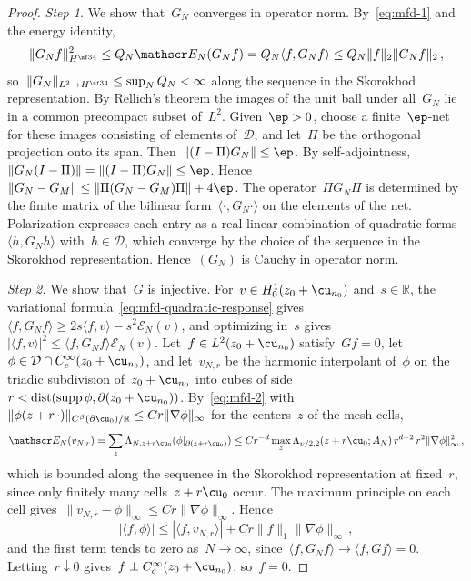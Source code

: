 \documentclass[11pt]{amsart}
\begin{document}
\begin{proof}
\emph{Step 1.} We show that~$G_N$ converges in operator norm. By~\eqref{eq:mfd-1} and the energy identity,
\begin{equation*}
	\|G_Nf\|_{H^{\nf34}}^2\leq Q_N\mathscr E_N(G_Nf)=Q_N\langle f,G_Nf\rangle\leq Q_N\|f\|_2\|G_Nf\|_2\,,
\end{equation*}
so~$\|G_N\|_{L^2\to H^{\nf34}}\leq\sup_NQ_N<\infty$ along the sequence in the Skorokhod representation. By Rellich's theorem the images of the unit ball under all~$G_N$ lie in a common precompact subset of~$L^2$. Given~$\ep>0$, choose a finite~$\ep$-net for these images consisting of elements of~$\mathcal D$, and let~$\Pi$ be the orthogonal projection onto its span. Then~$\|(I-\Pi)G_N\|\leq\ep$. By self-adjointness,~$\|G_N(I-\Pi)\|=\|(I-\Pi)G_N\|\leq\ep$. Hence~$\|G_N-G_M\|\leq\|\Pi(G_N-G_M)\Pi\|+4\ep$. The operator~$\Pi G_N\Pi$ is determined by the finite matrix of the bilinear form~$\langle\cdot,G_N\cdot\rangle$ on the elements of the net. Polarization expresses each entry as a real linear combination of quadratic forms~$\langle h,G_Nh\rangle$ with~$h\in\mathcal D$, which converge by the choice of the sequence in the Skorokhod representation. Hence~$(G_N)$ is Cauchy in operator norm.

\smallskip

\emph{Step 2.} We show that~$G$ is injective. For~$v\in H^1_0(z_0+\cu_{n_0})$ and~$s\in\mathbb R$, the variational formula~\eqref{eq:mfd-quadratic-response} gives~$\langle f,G_Nf\rangle\geq2s\langle f,v\rangle-s^2\mathscr E_N(v)$, and optimizing in~$s$ gives~$|\langle f,v\rangle|^2\leq\langle f,G_Nf\rangle \mathscr E_N(v)$. Let~$f\in L^2(z_0+\cu_{n_0})$ satisfy~$Gf=0$, let~$\phi\in\mathcal D\cap C_c^\infty(z_0+\cu_{n_0})$, and let~$v_{N,r}$ be the harmonic interpolant of~$\phi$ on the triadic subdivision of~$z_0+\cu_{n_0}$ into cubes of side~$r<\operatorname{dist}(\operatorname{supp}\phi,\partial(z_0+\cu_{n_0}))$. By~\eqref{eq:mfd-2} with~$\|\phi(z+r\,\cdot)\|_{C^\beta(\partial \cu_0)/\mathbb R}\leq Cr\|\nabla\phi\|_\infty$ for the centers~$z$ of the mesh cells,
\begin{equation*}
	\mathscr E_N(v_{N,r})=\sum_z\Lambda_{N,z+r\cu_0}(\phi|_{\partial(z+r\cu_0)})
	\leq Cr^{-d}\max_z\Lambda_{\upsilon/2,2}(z+r\cu_0;A_N)\,r^{d-2}\,r^2\|\nabla\phi\|_\infty^2\,,
\end{equation*}
which is bounded along the sequence in the Skorokhod representation at fixed~$r$, since only finitely many cells~$z+r\cu_0$ occur. The maximum principle on each cell gives~$\|v_{N,r}-\phi\|_\infty\leq Cr\|\nabla\phi\|_\infty$. Hence
\begin{equation*}
	|\langle f,\phi\rangle|\leq|\langle f,v_{N,r}\rangle|+Cr\|f\|_1\|\nabla\phi\|_\infty\,,
\end{equation*}
and the first term tends to zero as~$N\to\infty$, since~$\langle f,G_Nf\rangle\to\langle f,Gf\rangle=0$. Letting~$r\downarrow0$ gives~$f\perp C_c^\infty(z_0+\cu_{n_0})$, so~$f=0$.


\end{proof}
\end{document}
